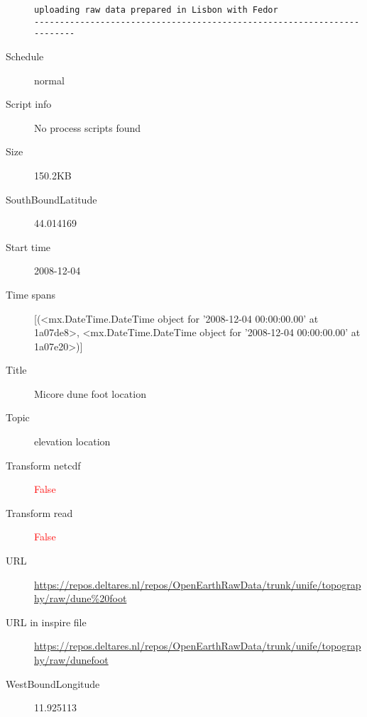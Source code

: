 \documentclass[9]{report}
\begin{document}
\begin{description}
\begin{verbatim}
uploading raw data prepared in Lisbon with Fedor
------------------------------------------------------------------------

\end{verbatim}
  \item[Schedule] normal
  \item[Script info] No process scripts found
  \item[Size] 150.2KB
  \item[SouthBoundLatitude] 44.014169
  \item[Start time] 2008-12-04
  \item[Time spans] [(<mx.DateTime.DateTime object for '2008-12-04 00:00:00.00' at 1a07de8>, <mx.DateTime.DateTime object for '2008-12-04 00:00:00.00' at 1a07e20>)]
  \item[Title]  Micore dune foot location 
  \item[Topic] elevation location
  \item[Transform netcdf] \textcolor{red}{False}
  \item[Transform read] \textcolor{red}{False}
  \item[URL] \href{https://repos.deltares.nl/repos/OpenEarthRawData/trunk/unife/topography/raw/dune\%20foot}{https://repos.deltares.nl/repos/OpenEarthRawData/trunk/unife/topography/raw/dune\%20foot}
  \item[URL in inspire file] \href{https://repos.deltares.nl/repos/OpenEarthRawData/trunk/unife/topography/raw/dunefoot}{https://repos.deltares.nl/repos/OpenEarthRawData/trunk/unife/topography/raw/dunefoot}
  \item[WestBoundLongitude] 11.925113
\end{description}
\end{document}

